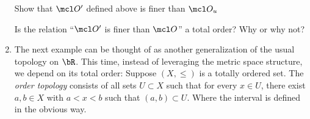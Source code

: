 \documentclass{pset}
\begin{document}
\begin{enumerate}[label=(\alph*)]
    \begin{exercise}
        Show that $\mcl O'$ defined above is finer than $\mcl O_u$
    \end{exercise}
    \begin{exercise}
        Is the relation ``$\mcl O'$ is finer than $\mcl O$'' a total order? Why or why not?
    \end{exercise}
    \item The next example can be thought of as another generalization of the usual topology on $\bR$. This time, instead of leveraging the metric space structure, we depend on its total order: Suppose $(X, \leq)$ is a totally ordered set. The \emph{order topology} consists of all sets $U \subset X$ such that for every $x \in U$, there exist $a, b \in X$ with $a < x < b$ such that $(a, b) \subset U$. Where the interval is defined in the obvious way.
    
\end{enumerate}
\end{document}
